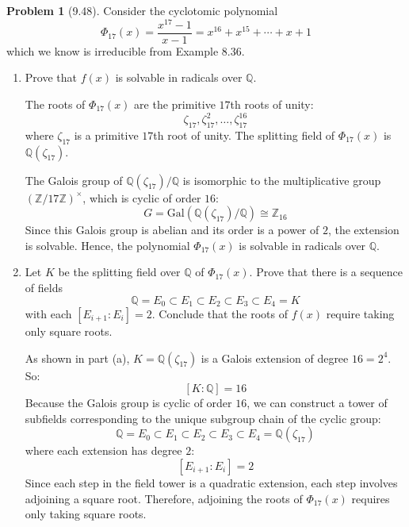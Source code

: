 \documentclass[12pt]{article}
\theoremstyle{definition}
\newtheorem{problem}{Problem}
\begin{document}
\begin{problem}[9.48]
    Consider the cyclotomic polynomial
    \[
        \Phi_{17}(x) = \frac{x^{17} - 1}{x - 1} = x^{16} + x^{15} + \cdots + x + 1
    \]
    which we know is irreducible from Example 8.36.
    \begin{enumerate}[label=(\alph*)]
        \item Prove that $f(x)$ is solvable in radicals over $\mathbb{Q}$.
        
        \begin{solution}
            The roots of $\Phi_{17}(x)$ are the primitive $17$th roots of unity:
            \[
                \zeta_{17}, \zeta_{17}^2, \ldots, \zeta_{17}^{16}
            \]
            where $\zeta_{17}$ is a primitive $17$th root of unity. The splitting field of $\Phi_{17}(x)$ is $\mathbb{Q}(\zeta_{17})$.

            The Galois group of $\mathbb{Q}(\zeta_{17})/\mathbb{Q}$ is isomorphic to the multiplicative group $(\mathbb{Z}/17\mathbb{Z})^\times$, which is cyclic of order $16$:
            \[
                G = \text{Gal}(\mathbb{Q}(\zeta_{17})/\mathbb{Q}) \cong \mathbb{Z}_{16}
            \]
            Since this Galois group is abelian and its order is a power of $2$, the extension is solvable. Hence, the polynomial $\Phi_{17}(x)$ is solvable in radicals over $\mathbb{Q}$.
        \end{solution}

        \item Let $K$ be the splitting field over $\mathbb{Q}$ of $\Phi_{17}(x)$. Prove that there is a sequence of fields
              \[
                  \mathbb{Q} = E_0 \subset E_1 \subset E_2 \subset E_3 \subset E_4 = K
              \]
              with each $[E_{i+1} : E_i] = 2$. Conclude that the roots of $f(x)$ require taking only square roots.
        
        \begin{solution}
            As shown in part (a), $K = \mathbb{Q}(\zeta_{17})$ is a Galois extension of degree $16 = 2^4$. So:
            \[
                [K : \mathbb{Q}] = 16
            \]
            Because the Galois group is cyclic of order $16$, we can construct a tower of subfields corresponding to the unique subgroup chain of the cyclic group:
            \[
                \mathbb{Q} = E_0 \subset E_1 \subset E_2 \subset E_3 \subset E_4 = \mathbb{Q}(\zeta_{17})
            \]
            where each extension has degree $2$:
            \[
                [E_{i+1} : E_i] = 2
            \]
            Since each step in the field tower is a quadratic extension, each step involves adjoining a square root. Therefore, adjoining the roots of $\Phi_{17}(x)$ requires only taking square roots.
        \end{solution}


\end{enumerate}
\end{problem}
\end{document}
